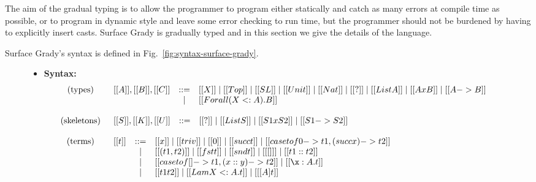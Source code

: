 The aim of the gradual typing is to allow the programmer to program
either statically and catch as many errors at compile time as
possible, or to program in dynamic style and leave some error checking
to run time, but the programmer should not be burdened by having to
explicitly insert casts.  Surface Grady is gradually typed and in this
section we give the details of the language.

Surface Grady's syntax is defined in
Fig.~\ref{fig:syntax-surface-grady}.  
\begin{figure}
  \small
  \begin{mdframed}
    \begin{itemize}
    \item[] \textbf{Syntax:}
      \[
      \begin{array}{cl}
        \begin{array}{l}
          \text{(types)}\\\\
        \end{array}     &
        \begin{array}{lcl}
          [[A]],[[B]],[[C]] & ::= & [[X]] \mid [[Top]] \mid [[SL]] \mid [[Unit]] \mid [[Nat]] \mid [[?]] \mid [[List A]] \mid [[A x B]] \mid [[A -> B]] \\ & \mid &[[Forall (X <: A).B]]\\
        \end{array}\\\\
        
        \text{(skeletons)} &
        \begin{array}{lcl}
          [[S]],[[K]],[[U]] & ::= & [[?]] \mid [[List S]] \mid [[S1 x S2]] \mid [[S1 -> S2]]\\
        \end{array}\\\\
        
        \begin{array}{l}
          \text{(terms)}\\\\\\\\
        \end{array}     &
        \begin{array}{lcl}
          [[t]] & ::= & [[x]] \mid [[triv]] \mid [[0]] \mid [[succ t]] \mid [[case t of 0 -> t1, (succ x) -> t2]] \\ & \mid & [[(t1 , t2)]] \mid [[fst t]] \mid [[snd t]] \mid [[ [] ]] \mid [[t1 :: t2]] \\ & \mid & [[case t of [] -> t1, (x :: y) -> t2]] \mid [[\x : A.t]] \\ & \mid & [[t1 t2]] \mid [[Lam X <: A.t]] \mid [[ [ A ] t ]]\\
        \end{array}\\\\
        

\end{array}\]
\end{itemize}
\end{mdframed}
\end{figure}
